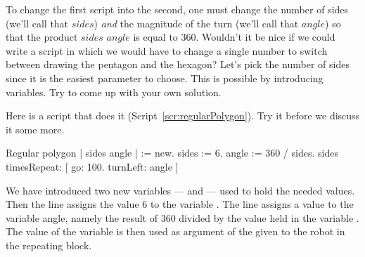 \newcommand{\replace}[2]{The difference between the two scripts is that}{To change the first script into the second,} one must change the
number of sides (\newcommand{\replace}[2]{let us}{we'll} call \newcommand{\replace}[2]{it $s$}{that $sides$}) \emph{and} the magnitude of the
turn (\newcommand{\replace}[2]{let us}{we'll} call \newcommand{\replace}[2]{it $T$}{that $angle$}) \newcommand{\replace}[2]{such}{so} that the product \newcommand{\replace}[2]{$s\times T$}{$sides$ \times $angle$} is equal
to 360.\newcommand{\add}[1]{\paragraph
}
Wouldn't it be nice if we could write a script\newcommand{\remove}[1]{,} in which we
\newcommand{\remove}[1]{only} would have to change \newcommand{\add}[1]{only} a single number\newcommand{\replace}[2]{,}{ to switch between drawing the pentagon and the hexagon?} \newcommand{\replace}[2]{let us say}{Let's pick} the number of
sides \newcommand{\add}[1]{$sides$ to be that single number,} since \newcommand{\replace}[2]{this}{it} is the easiest parameter to choose\newcommand{\replace}[2]{?}{.}  This is possible
by introducing variables. \newcommand{\add}[1]{\paragraph
}
Try to come up with your own solution.  




Here is a script \newcommand{\replace}[2]{where this is done}{that does it} (Script~\ref{scr:regularPolygon}). Try it
before we discuss \newcommand{\replace}[2]{more about it}{it some more}. 

\begin{scriptwithtitle}{Regular polygon}\label{scr:regularPolygon}
| \caro sides angle |
\caro := \Turtle new.
sides := 6.
angle := 360 / sides.
sides timesRepeat: 
                  [ \caro go: 100.
                  \caro turnLeft: angle ]
\end{scriptwithtitle}

We have introduced two new
variables ---  and  --- used to hold
the needed values. Then\newcommand{\remove}[1]{,} the line  assigns the
value 6 to the variable \newcommand{\replace}[2]{ and the}{. The} line  assigns a value to the variable angle, \newcommand{\replace}[2]{which is}{namely}
the result of 360 divided by the value held in the variable
\newcommand{\replace}[2]{\ct{number}}{}. The value of the variable  is then
used as argument of the \newcommand{\remove}[1]{command} \turnLeft \newcommand{\add}[1]{command} given to
the robot in the repeating block.

